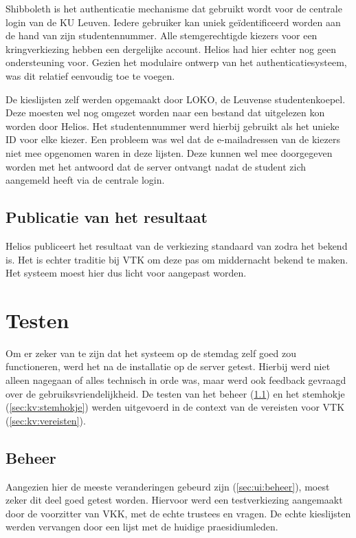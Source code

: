 Shibboleth is het authenticatie mechanisme dat gebruikt wordt voor de centrale login van de KU Leuven. Iedere gebruiker kan uniek ge\"identificeerd worden aan de hand van zijn studentennummer. Alle stemgerechtigde kiezers voor een kringverkiezing hebben een dergelijke account. Helios had hier echter nog geen ondersteuning voor. Gezien het modulaire ontwerp van het authenticatiesysteem, was dit relatief eenvoudig toe te voegen.

\npar De kieslijsten zelf werden opgemaakt door LOKO, de Leuvense studentenkoepel. Deze moesten wel nog omgezet worden naar een bestand dat uitgelezen kon worden door Helios. Het studentennummer werd hierbij gebruikt als het unieke ID voor elke kiezer. Een probleem was wel dat de e-mailadressen van de kiezers niet mee opgenomen waren in deze lijsten. Deze kunnen wel mee doorgegeven worden met het antwoord dat de server ontvangt nadat de student zich aangemeld heeft via de centrale login.

\subsection{Publicatie van het resultaat}
\label{sec:kv:publicatie_van_het_resultaat}

Helios publiceert het resultaat van de verkiezing standaard van zodra het bekend is. Het is echter traditie bij VTK om deze pas om middernacht bekend te maken. Het systeem moest hier dus licht voor aangepast worden.

\section{Testen}
\label{sec:kv:testen}

Om er zeker van te zijn dat het systeem op de stemdag zelf goed zou functioneren, werd het na de installatie op de server getest. Hierbij werd niet alleen nagegaan of alles technisch in orde was, maar werd ook feedback gevraagd over de gebruiksvriendelijkheid. De testen van het beheer (\ref{sec:kv:beheer}) en het stemhokje (\ref{sec:kv:stemhokje}) werden uitgevoerd in de context van de vereisten voor VTK (\ref{sec:kv:vereisten}).

\subsection{Beheer}
\label{sec:kv:beheer}

Aangezien hier de meeste veranderingen gebeurd zijn (\ref{sec:ui:beheer}), moest zeker dit deel goed getest worden. Hiervoor werd een testverkiezing aangemaakt door de voorzitter van VKK, met de echte trustees en vragen. De echte kieslijsten werden vervangen door een lijst met de huidige praesidiumleden.

